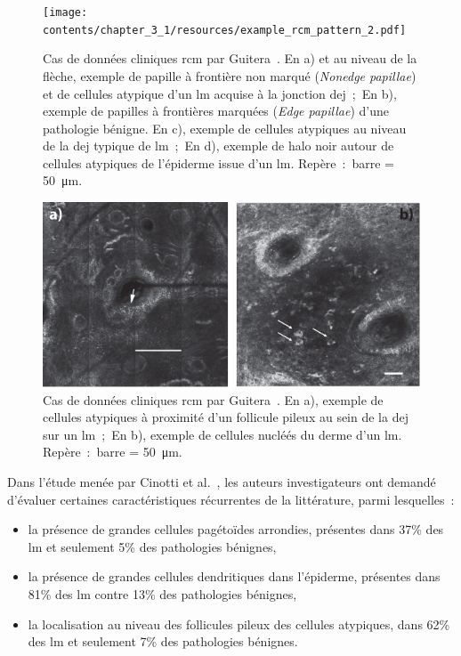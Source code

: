 \begin{figure}[H]
    \begin{center}
        \texttt{[image: contents/chapter\_3\_1/resources/example\_rcm\_pattern\_2.pdf]}
        \caption{Cas de données cliniques \gls{rcm} par Guitera~\cite{Guitera2010}. En a) et au niveau de la flèche, exemple de papille à frontière non marqué (\textit{Nonedge papillae}) et de cellules atypique d'un \gls{lm} acquise à la jonction \gls{dej}~;~En b), exemple de papilles à frontières marquées (\textit{Edge papillae}) d'une pathologie bénigne. En c), exemple de cellules atypiques au niveau de la \gls{dej} typique de \gls{lm}~;~En d), exemple de halo noir autour de cellules atypiques de l'épiderme issue d'un \gls{lm}. Repère~:~barre = \SI{50}{\micro\metre}.}
        \label{fig:example_rcm_pattern_2}
    \end{center} 
\end{figure}\par

\begin{figure}[H]
    \begin{center}
        \includegraphics[width=0.8 \linewidth]{contents/chapter_3_1/resources/example_rcm_pattern_3.pdf}
        \caption{Cas de données cliniques \gls{rcm} par Guitera~\cite{Guitera2010}. En a), exemple de cellules atypiques à proximité d'un follicule pileux au sein de la \gls{dej} sur un \gls{lm}~;~En b), exemple de cellules nucléés du derme d'un \gls{lm}. Repère~:~barre = \SI{50}{\micro\metre}.}
        \label{fig:example_rcm_pattern_3}
    \end{center} 
\end{figure}\par

Dans l'étude menée par Cinotti et al.~\cite{Cinotti2018}, les auteurs investigateurs ont demandé d'évaluer certaines caractéristiques récurrentes de la littérature, parmi lesquelles~:
\begin{itemize}
    \item la présence de grandes cellules pagétoïdes arrondies, présentes dans 37\% des \gls{lm} et seulement 5\% des pathologies bénignes,
    \item la présence de grandes cellules dendritiques dans l'épiderme, présentes dans 81\% des \gls{lm} contre 13\% des pathologies bénignes,
    \item la localisation au niveau des follicules pileux des cellules atypiques, dans 62\% des \gls{lm} et seulement 7\% des pathologies bénignes.
\end{itemize}\par

